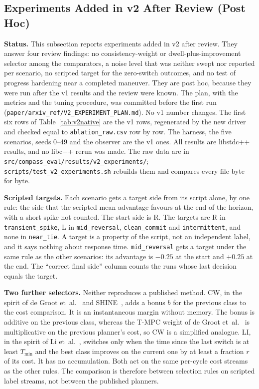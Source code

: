 \documentclass[11pt]{article}
\newcommand{\code}[1]{\texttt{#1}}
\begin{document}
\FloatBarrier
\subsection{Experiments Added in v2 After Review (Post Hoc)}\label{subsec:v2}

\noindent\textbf{Status.} This subsection reports experiments added in v2 after review. They answer four review findings: no consistency-weight or dwell-plus-improvement selector among the comparators, a noise level that was neither swept nor reported per scenario, no scripted target for the zero-switch outcomes, and no test of progress hardening near a completed maneuver. They are post hoc, because they were run after the v1 results and the review were known. The plan, with the metrics and the tuning procedure, was committed before the first run (\code{paper/arxiv\_ref/V2\_EXPERIMENT\_PLAN.md}). No v1 number changes. The first six rows of Table~\ref{tab:v2native} are the v1 rows, regenerated by the new driver and checked equal to \code{ablation\_raw.csv} row by row. The harness, the five scenarios, seeds 0--49 and the observer are the v1 ones. All results are libstdc++ results, and no libc++ rerun was made. The raw data are in \code{src/compass\_eval/results/v2\_experiments/}; \code{scripts/test\_v2\_experiments.sh} rebuilds them and compares every file byte for byte.

\noindent\textbf{Scripted targets.} Each scenario gets a target side from its script alone, by one rule: the side that the scripted mean advantage favours at the end of the horizon, with a short spike not counted. The start side is R. The targets are R in \code{transient\_spike}, L in \code{mid\_reversal}, \code{clean\_commit} and \code{intermittent}, and none in \code{near\_tie}. A target is a property of the script, not an independent label, and it says nothing about response time. \code{mid\_reversal} gets a target under the same rule as the other scenarios: its advantage is $-0.25$ at the start and $+0.25$ at the end. The ``correct final side'' column counts the runs whose last decision equals the target.

\noindent\textbf{Two further selectors.} Neither reproduces a published method. CW, in the spirit of de Groot et~al.~\cite{degroot2024topology} and SHINE~\cite{martinezbaselga2026shine}, adds a bonus $b$ for the previous class to the cost comparison. It is an instantaneous margin without memory. The bonus is additive on the previous class, whereas the T-MPC weight of de Groot et~al.~\cite{degroot2024topology} is multiplicative on the previous planner's cost, so CW is a simplified analogue. LI, in the spirit of Li et~al.~\cite{li2026bigcbf}, switches only when the time since the last switch is at least $T_{\min}$ and the best class improves on the current one by at least a fraction $r$ of its cost. It has no accumulation. Both act on the same per-cycle cost streams as the other rules. The comparison is therefore between selection rules on scripted label streams, not between the published planners.
\end{document}
